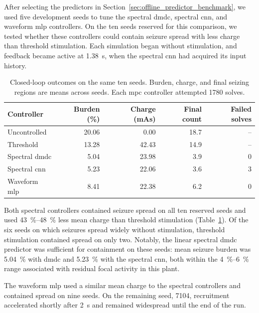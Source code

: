 After selecting the predictors in Section~\ref{sec:offline_predictor_benchmark}, we used five development seeds to tune the spectral \ac{dmdc}, spectral \ac{cnn}, and waveform \ac{mlp} controllers.
On the ten seeds reserved for this comparison, we tested whether these controllers could contain seizure spread with less charge than threshold stimulation.
Each simulation began without stimulation, and feedback became active at \SI{1.38}{\second}, when the spectral \ac{cnn} had acquired its input history.

\begin{table}
  \centering
  \caption{Closed-loop outcomes on the same ten seeds.
  Burden, charge, and final seizing regions are means across seeds.
  Each \ac{mpc} controller attempted \num{1780} solves.}\label{tab:controller_comparison}
  \begin{tabular}{@{}lrrrr@{}}
    \toprule
    Controller & Burden (\%) & Charge (mAs) & Final count & Failed solves \\
    \midrule
    Uncontrolled & 20.06 & 0.00 & 18.7 & -- \\
    Threshold & 13.28 & 42.43 & 14.9 & -- \\
    Spectral \ac{dmdc} & 5.04 & 23.98 & 3.9 & 0 \\
    Spectral \ac{cnn} & 5.23 & 22.06 & 3.6 & 3 \\
    Waveform \ac{mlp} & 8.41 & 22.38 & 6.2 & 0 \\
    \bottomrule
  \end{tabular}
\end{table}

Both spectral controllers contained seizure spread on all ten reserved seeds and used \SIrange{43}{48}{\percent} less mean charge than threshold stimulation (Table~\ref{tab:controller_comparison}).
Of the six seeds on which seizures spread widely without stimulation, threshold stimulation contained spread on only two.
Notably, the linear spectral \ac{dmdc} predictor was sufficient for containment on these seeds: mean seizure burden was \SI{5.04}{\percent} with \ac{dmdc} and \SI{5.23}{\percent} with the spectral \ac{cnn}, both within the \SIrange{4}{6}{\percent} range associated with residual focal activity in this plant.

The waveform \ac{mlp} used a similar mean charge to the spectral controllers and contained spread on nine seeds.
On the remaining seed, 7104, recruitment accelerated shortly after \SI{2}{\second} and remained widespread until the end of the run.

